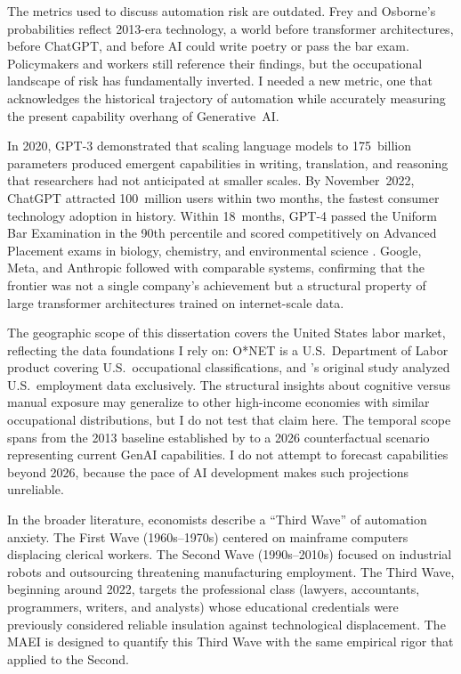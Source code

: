 The metrics used to discuss automation risk are outdated.  Frey and Osborne's probabilities
reflect 2013-era technology, a world before transformer architectures,
before ChatGPT, and before AI could write poetry or pass the bar exam.
Policymakers and workers still reference their findings, but the
occupational landscape of risk has fundamentally inverted.  I needed a new
metric, one that acknowledges the historical trajectory of automation while
accurately measuring the present capability overhang of Generative~AI.

In 2020, GPT-3
demonstrated that scaling language models to 175~billion parameters produced
emergent capabilities in writing, translation, and reasoning that
researchers had not anticipated at smaller scales.  By November~2022,
ChatGPT attracted 100~million users within two months, the fastest consumer
technology adoption in history.  Within 18~months, GPT-4 passed the Uniform
Bar Examination in the 90th percentile and scored competitively on Advanced
Placement exams in biology, chemistry, and environmental science
\citep{OpenAI_2023}.  Google, Meta, and Anthropic followed with comparable
systems, confirming that the frontier was not a single company's achievement
but a structural property of large transformer architectures trained on
internet-scale data.

The geographic scope of this dissertation covers the United States labor
market, reflecting the data foundations I rely on: O*NET is a
U.S.\ Department of Labor product covering U.S.\ occupational
classifications, and \citet{Frey_Osborne_2017}'s original study analyzed
U.S.\ employment data exclusively.  The structural insights about cognitive
versus manual exposure may generalize to other high-income economies with
similar occupational distributions, but I do not test that claim here.  The
temporal scope spans from the 2013 baseline established by
\citet{Frey_Osborne_2017} to a 2026 counterfactual scenario representing
current GenAI capabilities.  I do not attempt to forecast capabilities
beyond 2026, because the pace of AI development makes such projections
unreliable.

In the broader literature, economists describe a ``Third Wave'' of
automation anxiety.  The First Wave (1960s--1970s) centered on mainframe
computers displacing clerical workers.  The Second Wave (1990s--2010s)
focused on industrial robots and outsourcing threatening manufacturing
employment.  The Third Wave, beginning around 2022, targets the professional
class (lawyers, accountants, programmers, writers, and analysts) whose
educational credentials were previously considered reliable insulation
against technological displacement.  The MAEI is designed to quantify this
Third Wave with the same empirical rigor that \citet{Frey_Osborne_2017}
applied to the Second.

